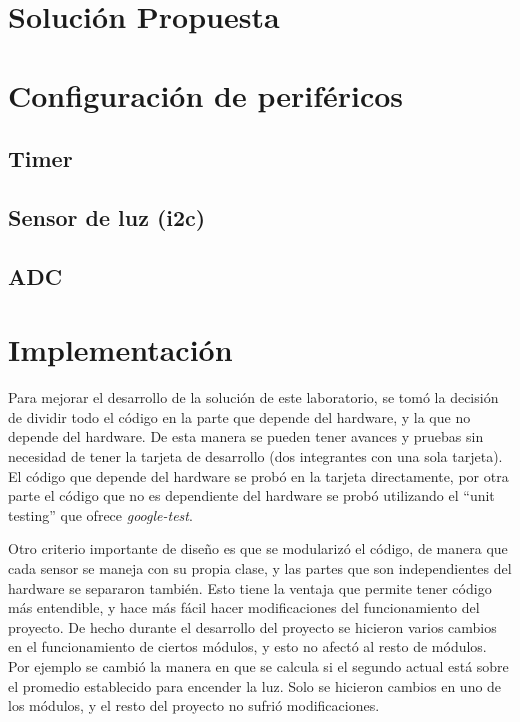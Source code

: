 \section{Solución Propuesta}

\section{Configuración de periféricos}

\subsection{Timer}

\subsection{Sensor de luz (i2c)}

\subsection{ADC}

\section{Implementación}

Para mejorar el desarrollo de la solución de este laboratorio, se tomó la decisión de dividir todo
el código en la parte que depende del hardware, y la que no depende del hardware. De esta manera se
pueden tener avances y pruebas sin necesidad de tener la tarjeta de desarrollo (dos integrantes con
una sola tarjeta). El código que depende del hardware se probó en la tarjeta directamente, por otra
parte el código que no es dependiente del hardware se probó utilizando el ``unit testing'' que
ofrece \textit{google-test}.

Otro criterio importante de diseño es que se modularizó el código, de manera que cada sensor se
maneja con su propia clase, y las partes que son independientes del hardware se separaron
también. Esto tiene la ventaja que permite tener código más entendible, y hace más fácil hacer
modificaciones del funcionamiento del proyecto. De hecho durante el desarrollo del proyecto se
hicieron varios cambios en el funcionamiento de ciertos módulos, y esto no afectó al resto de
módulos. Por ejemplo se cambió la manera en que se calcula si el segundo actual está sobre el
promedio establecido para encender la luz. Solo se hicieron cambios en uno de los módulos, y el
resto del proyecto no sufrió modificaciones.

